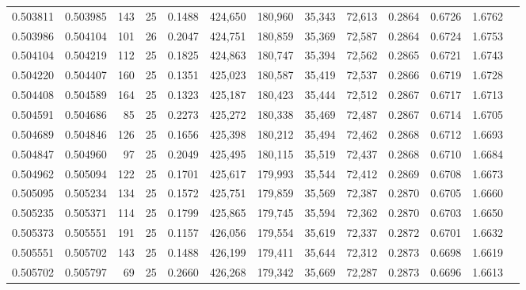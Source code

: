 \begin{tabular}{rrrrrrrrrrrrr}
0.503811 & 0.503985 &   143 &  25 &                                     0.1488 & 424,650 & 180,960 &  35,343 &  72,613 & 0.2864 & 0.6726 & 1.6762 \\
0.503986 & 0.504104 &   101 &  26 &                                     0.2047 & 424,751 & 180,859 &  35,369 &  72,587 & 0.2864 & 0.6724 & 1.6753 \\
0.504104 & 0.504219 &   112 &  25 &                                     0.1825 & 424,863 & 180,747 &  35,394 &  72,562 & 0.2865 & 0.6721 & 1.6743 \\
0.504220 & 0.504407 &   160 &  25 &                                     0.1351 & 425,023 & 180,587 &  35,419 &  72,537 & 0.2866 & 0.6719 & 1.6728 \\
0.504408 & 0.504589 &   164 &  25 &                                     0.1323 & 425,187 & 180,423 &  35,444 &  72,512 & 0.2867 & 0.6717 & 1.6713 \\
0.504591 & 0.504686 &    85 &  25 &                                     0.2273 & 425,272 & 180,338 &  35,469 &  72,487 & 0.2867 & 0.6714 & 1.6705 \\
0.504689 & 0.504846 &   126 &  25 &                                     0.1656 & 425,398 & 180,212 &  35,494 &  72,462 & 0.2868 & 0.6712 & 1.6693 \\
0.504847 & 0.504960 &    97 &  25 &                                     0.2049 & 425,495 & 180,115 &  35,519 &  72,437 & 0.2868 & 0.6710 & 1.6684 \\
0.504962 & 0.505094 &   122 &  25 &                                     0.1701 & 425,617 & 179,993 &  35,544 &  72,412 & 0.2869 & 0.6708 & 1.6673 \\
0.505095 & 0.505234 &   134 &  25 &                                     0.1572 & 425,751 & 179,859 &  35,569 &  72,387 & 0.2870 & 0.6705 & 1.6660 \\
0.505235 & 0.505371 &   114 &  25 &                                     0.1799 & 425,865 & 179,745 &  35,594 &  72,362 & 0.2870 & 0.6703 & 1.6650 \\
0.505373 & 0.505551 &   191 &  25 &                                     0.1157 & 426,056 & 179,554 &  35,619 &  72,337 & 0.2872 & 0.6701 & 1.6632 \\
0.505551 & 0.505702 &   143 &  25 &                                     0.1488 & 426,199 & 179,411 &  35,644 &  72,312 & 0.2873 & 0.6698 & 1.6619 \\
0.505702 & 0.505797 &    69 &  25 &                                     0.2660 & 426,268 & 179,342 &  35,669 &  72,287 & 0.2873 & 0.6696 & 1.6613 \\

\end{tabular}
